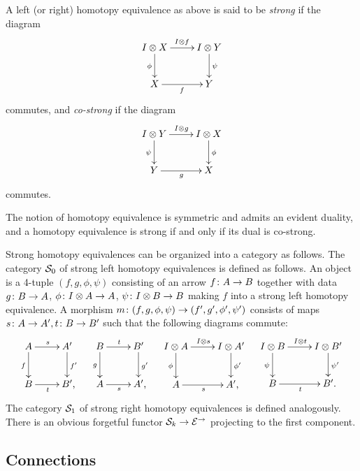 \documentclass[reqno,10pt,a4paper,oneside,draft]{amsart}
\begin{document}
\begin{definition} \label{def:strhe}
A left (or right) homotopy equivalence as above is said to be \emph{strong} if the diagram
\[
\xymatrix{
  \interval \otimes X \ar[r]^{\interval \otimes f} \ar[d]_{\phi} & \interval \otimes Y \ar[d]^{\psi} \\
  X \ar[r]_{f} & Y
}
\]
commutes, and \emph{co-strong} if the diagram
\[
  \xymatrix{
  \interval \otimes Y \ar[r]^{\interval \otimes g} \ar[d]_{\psi} & \interval \otimes X \ar[d]^{\phi} \\
  Y \ar[r]_{g} & X
}
\]
commutes.
\end{definition}

The notion of homotopy equivalence is symmetric and admits an evident duality, and a homotopy equivalence is strong if and only if its dual is co-strong. 

Strong homotopy equivalences can be organized into a category as follows. The category $\cal{S}_0$ of strong left homotopy equivalences is defined as follows.
An object is a 4-tuple $(f, g, \phi, \psi)$ consisting of an arrow $f \co A \to B$ together with data $g \co B \to A$, $\phi \co \interval \otimes A \to A$, $\psi \co \interval \otimes B \to B$ making $f$ into a strong left homotopy equivalence.
A morphism $m \co (f, g, \phi, \psi) \to (f', g', \phi', \psi')$ consists of maps $s \co A \to A', t \co B \to B'$ such that the following diagrams commute:
\begin{align*}
\xymatrix{
  A
  \ar[r]^{s}
  \ar[d]_{f}
&
  A'
  \ar[d]^{f'}
\\
  B
  \ar[r]_{t}
&
  B'\rlap{,}
}
&&
\xymatrix{
  B
  \ar[r]^{t}
  \ar[d]_{g}
&
  B'
  \ar[d]^{g'}
\\
  A
  \ar[r]_{s}
&
  A'\rlap{,}
}
&&
\xymatrix{
  \interval \otimes A
  \ar[d]_{\phi}
  \ar[r]^{\interval \otimes s}
&
  I \otimes A'
  \ar[d]^{\phi'}
\\
  A
  \ar[r]_{s}
&
  A' \rlap{,}
}
&&
\xymatrix{
  \interval \otimes B
  \ar[d]_{\psi}
  \ar[r]^{\interval \otimes t}
&
  I \otimes B'
  \ar[d]^{\psi'}
\\
  B
  \ar[r]_{t}
&
  B' \rlap{.}
}
\end{align*}
The category $\cal{S}_1$ of strong right homotopy equivalences is defined analogously.
There is an obvious forgetful functor $\cal{S}_k \to \catE^\to$ projecting to the first component.

\subsection*{Connections}
\end{document}
